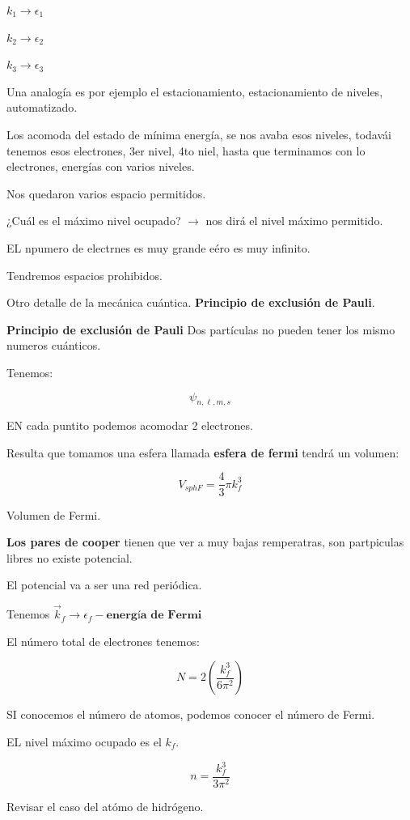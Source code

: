 \documentclass{article}
\begin{document}
 
 $  k_{1} \to \epsilon_{1} $
 
 
 $ k_{2} \to \epsilon_{2} $
 
 $k_{3} \to \epsilon_{3}$


Una analogía es por ejemplo el estacionamiento, estacionamiento de niveles, automatizado.

Los acomoda del estado de mínima energía, se nos avaba esos niveles, todavái tenemos esos electrones, 3er nivel, 4to niel, hasta que terminamos con lo electrones, energías con varios niveles. 

Nos quedaron varios espacio permitidos.


¿Cuál es el máximo nivel ocupado? $\to$ nos dirá el nivel máximo permitido.


EL npumero de electrnes es muy grande eéro es muy infinito.



Tendremos espacios prohibidos. 


Otro detalle de la mecánica cuántica. \textbf{Principio de exclusión de Pauli}. 


\textbf{Principio de exclusión de Pauli} Dos partículas no pueden tener los mismo numeros cuánticos.


Tenemos:


\[ \psi_{n,\ell,m,s}   \]

EN cada puntito podemos acomodar 2 electrones. 

Resulta que tomamos una esfera llamada \textbf{esfera de fermi} tendrá un volumen:


\[ V_{sphF} = \frac{4}{3}\pi k_{f}^{3} \]


Volumen de Fermi. 

\textbf{Los pares de cooper} tienen que ver a muy bajas remperatras, son partpiculas libres no existe potencial. 


El potencial va a ser una red periódica. 


Tenemos $\vec{k}_{f} \to \epsilon_{f} - \textbf{energía de Fermi}$

El número total de electrones tenemos:


\[  N = 2 \left(  \frac{k_{f}^{3}}{6\pi^{2}}  \right) \]


SI conocemos el número de atomos, podemos conocer el número de Fermi.


EL nivel máximo ocupado es el $k_{f}$.

\[  n = \frac{ k_{f}^{3}  }{ 3\pi^{2} } \]


Revisar el caso del atómo de hidrógeno. 
\end{document}
